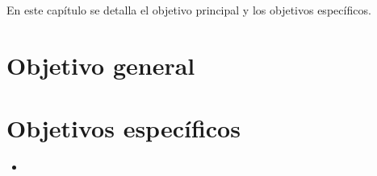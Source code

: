 \documentclass[../main/main.tex]{subfiles}
\begin{document}
\espacio

  En este capítulo se detalla el objetivo principal y los objetivos específicos.

  \section{Objetivo general}



  \section{Objetivos específicos}

  \begin{itemize}
    \item 
  \end{itemize}
\end{document}
